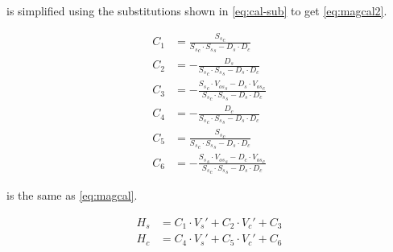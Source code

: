  is simplified using the substitutions shown in \cref{eq:cal-sub} to get \cref{eq:magcal2}.

\begin{equation}
    \begin{aligned}
        C_1 &=   \frac{{S_s}_c}{{S_s}_c \cdot {S_s}_s - D_s \cdot D_c}\\
        C_2 &= - \frac{D_s}{{S_s}_c \cdot {S_s}_s - D_s \cdot D_c}\\
        C_3 &= - \frac{{S_s}_c \cdot {V_{os}}_s  -D_s \cdot {V_{os}}_c}{{S_s}_c \cdot {S_s}_s - D_s \cdot D_c}\\
        C_4 &= - \frac{D_c}{{S_s}_c \cdot {S_s}_s - D_s \cdot D_c}\\
        C_5 &= \frac{{S_s}_c}{{S_s}_c \cdot {S_s}_s - D_s \cdot D_c}\\
        C_6 &= - \frac{{S_s}_s \cdot {V_{os}}_s  -D_c \cdot {V_{os}}_c}{{S_s}_c \cdot {S_s}_s - D_s \cdot D_c}
    \end{aligned}
    \label{eq:cal-sub}
\end{equation}

 is the same as \cref{eq:magcal}.

\begin{equation}
    \begin{split}
        H_s &= C_1 \cdot V_s' + C_2 \cdot V_c' + C_3\\
        H_c &= C_4 \cdot V_s' + C_5 \cdot V_c' + C_6
    \end{split}
    \label{eq:magcal2}
\end{equation}



